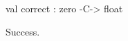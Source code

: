 \chklistingtrue
{}
\begin{ChkListingMsg}
val correct : zero -C-> float
\end{ChkListingMsg}
\begin{ChkListingErr}
Success.
\end{ChkListingErr}
